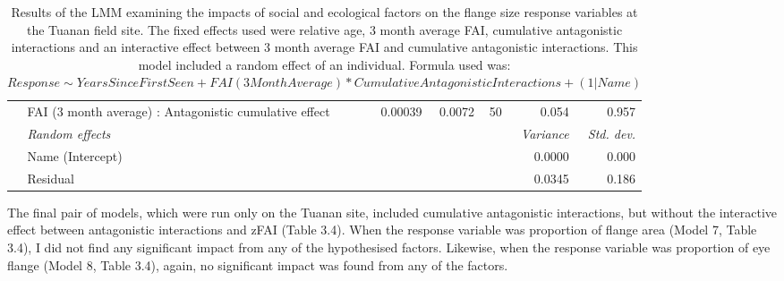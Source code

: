 \begin{table}
{\begin{tabular}{l l r r r r r}
    & FAI (3 month average) : Antagonistic cumulative effect & 0.00039 & 0.0072 & 50 & 0.054 &  0.957\\
    \cline{2-7}
        & \textit{Random effects} & & & & \textit{Variance} & \textit{Std. dev.}\\
    \cline{2-7} 
    & Name (Intercept) & & & & 0.0000 & 0.000 \\
    & Residual & & & & 0.0345 & 0.186 \\
     \hline 
\end{tabular}
    }
    \caption{Results of the LMM examining the impacts of social and ecological factors on the flange size response variables at the Tuanan field site. The fixed effects used were relative age, 3 month average FAI, cumulative antagonistic interactions and an interactive effect between 3 month average FAI and cumulative antagonistic interactions. This model included a random effect of an individual. 
    Formula used was: \(Response \sim YearsSinceFirstSeen + FAI (3MonthAverage) * CumulativeAntagonisticInteractions + (1 | Name)\) }
\end{table}


The final pair of models, which were run only on the Tuanan site, included cumulative antagonistic interactions, but without the interactive effect between antagonistic interactions and zFAI (Table 3.4). When the response variable was proportion of flange area (Model 7, Table 3.4), I did not find any significant impact from any of the hypothesised factors. Likewise, when the response variable was proportion of eye flange (Model 8, Table 3.4), again, no significant impact was found from any of the factors. 

